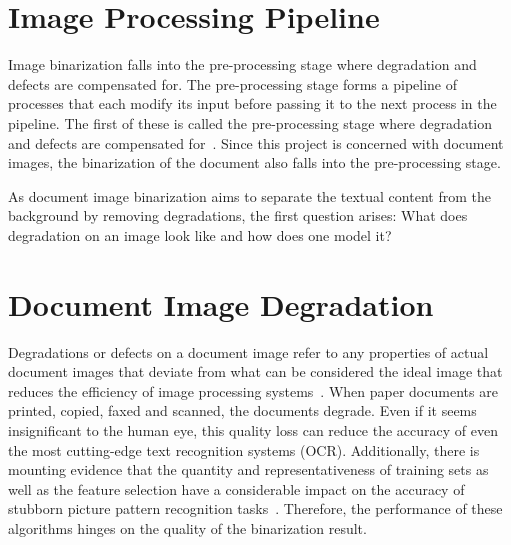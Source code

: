 \documentclass[a4paper, 12pt]{report}
\begin{document}
\section{Image Processing Pipeline}
Image binarization falls into the pre-processing stage where degradation and defects are compensated for. The pre-processing stage forms a pipeline of processes that each modify its input before passing it to the next process in the pipeline. The first of these is called the pre-processing stage where degradation and defects are compensated for~\cite{ramanath2005color}. Since this project is concerned with document images, the binarization of the document also falls into the pre-processing stage.\par

As document image binarization aims to separate the textual content from the background by removing degradations, the first question arises: What does degradation on an image look like and how does one model it?

\section{Document Image Degradation}
Degradations or defects on a document image refer to any properties of actual document images that deviate from what can be considered the ideal image that reduces the efficiency of image processing systems~\cite{Baird2007}. When paper documents are printed, copied, faxed and scanned, the documents degrade. Even if it seems insignificant to the human eye, this quality loss can reduce the accuracy of even the most cutting-edge text recognition systems (OCR). Additionally, there is mounting evidence that the quantity and representativeness of training sets as well as the feature selection have a considerable impact on the accuracy of stubborn picture pattern recognition tasks~\cite{Baird2007}. Therefore, the performance of these algorithms hinges on the quality of the binarization result. \par
\end{document}
